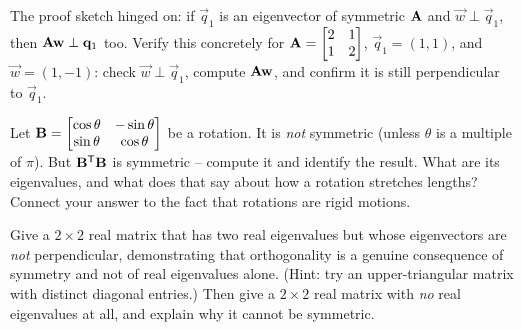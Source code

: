 \begin{exercise}
\label{ch26:ex-invariance}
The proof sketch hinged on: if $\vec{q}_1$ is an eigenvector of symmetric
$\mathbf{A}$ and $\vec{w}\perp\vec{q}_1$, then $\mathbf{A}\mathbf{w}\perp\mathbf{q}_1$ too.
Verify this concretely for $\mathbf{A}=\begin{bmatrix}2&1\\1&2\end{bmatrix}$,
$\vec{q}_1=(1,1)$, and $\vec{w}=(1,-1)$: check $\vec{w}\perp\vec{q}_1$, compute
$\mathbf{A}\mathbf{w}$, and confirm it is still perpendicular to $\vec{q}_1$.
\end{exercise}

\begin{exercise}
\label{ch26:ex-challenge}
Let $\mathbf{B}=\begin{bmatrix}\cos\theta&-\sin\theta\\\sin\theta&\cos\theta\end{bmatrix}$
be a rotation. It is \emph{not} symmetric (unless $\theta$ is a multiple of $\pi$). But
$\mathbf{B}^{\mathsf{T}}\mathbf{B}$ is symmetric -- compute it and identify the result. What are its
eigenvalues, and what does that say about how a rotation stretches lengths?
Connect your answer to the fact that rotations are rigid motions.
\end{exercise}

\begin{exercise}
\label{ch26:ex-fail}
Give a $2\times 2$ real matrix that has two real eigenvalues but whose
eigenvectors are \emph{not} perpendicular, demonstrating that orthogonality is a
genuine consequence of symmetry and not of real eigenvalues alone. (Hint: try an
upper-triangular matrix with distinct diagonal entries.) Then give a $2\times 2$
real matrix with \emph{no} real eigenvalues at all, and explain why it cannot be
symmetric.
\end{exercise}
